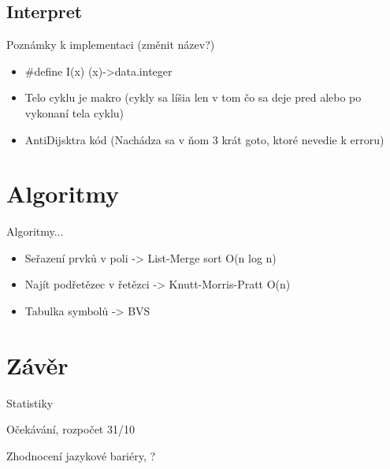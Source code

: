 \documentclass[13pt]{beamer}
\begin{document}
\subsection{Interpret}

\begin{frame}{Poznámky k implementaci (změnit název?)}

  \begin{itemize}
    \item \ttfamily \par\#define I(x) (x)->data.integer
    \item \sffamily Telo cyklu je makro (cykly sa líšia len v tom čo sa deje pred alebo po vykonaní tela cyklu)
    \item AntiDijsktra kód (Nachádza sa v ňom 3 krát goto, ktoré nevedie k erroru)
  \end{itemize}

\end{frame}

\section{Algoritmy}

\begin{frame}{Algoritmy...}

  \begin{itemize}
    \item Seřazení prvků v poli -> List-Merge sort O(n log n)
    \item Najít podřetězec v řetězci -> Knutt-Morris-Pratt O(n)
    \item Tabulka symbolů -> BVS
  \end{itemize}
  
\end{frame}

\section{Závěr}

\begin{frame}{Statistiky}
\end{frame}

\begin{frame}{Očekávání, rozpočet}
31/10
\end{frame}

\begin{frame}{Zhodnocení}
jazykové bariéry, ?
\end{frame}
\end{document}
